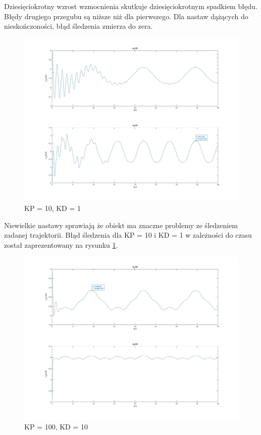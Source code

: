 \documentclass[12pt,a4paper]{article}
\begin{document}
    Dziesięciokrotny wzrost wzmocnienia skutkuje dziesięciokrotnym spadkiem błędu. Błędy drugiego przegubu są niższe niż dla pierwszego. Dla nastaw dążących do nieskończoności, błąd śledzenia zmierza do zera.

  \begin{figure}[H]
    \centering
    \includegraphics[height=0.4\textheight]{figures/qui10.jpg}
    \caption{KP = 10, KD = 1}
    \label{fig:10}
  \end{figure}

    Niewielkie nastawy sprawiają że obiekt ma znaczne problemy ze śledzeniem zadanej trajektorii. Błąd śledzenia dla  KP = 10 i KD = 1 w zależności do czasu został zaprezentowany na rysunku \ref{fig:10}.

  \begin{figure}[H]
    \centering
    \includegraphics[height=0.4\textheight]{figures/qui100.jpg}
    \caption{KP = 100, KD = 10}
    \label{fig:100}
  \end{figure}
\end{document}
